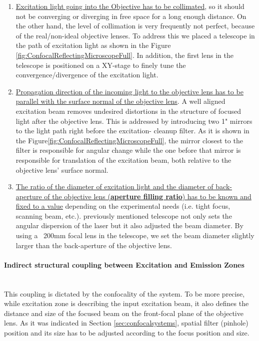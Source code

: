 \begin{enumerate}
	\item \ul{Excitation light going into the Objective has to be collimated}, so it should not be
	converging or diverging in free space for a long enough distance. On the other hand, the level of 
	collimation is very frequently not perfect, because of the real/non-ideal objective lenses.
	To address this we placed a telescope in the path of excitation light as shown in the Figure
	\ref{fig:ConfocalReflectingMicroscopeFull}. In addition, the first lens in the telescope is 
	positioned on a XY-stage to finely tune the convergence/divergence of the excitation light.
	
	\item \ul{Propagation direction of the incoming light to the objective lens has to be 
	parallel with the surface normal of the objective lens}. A well aligned excitation beam 
	removes undesired distortions in the structure of focused light after the objective lens.
	This is addressed by introducing two 1" mirrors to the light path right before the excitation-
	cleanup filter. As it is shown in the Figure\ref{fig:ConfocalReflectingMicroscopeFull},
	the mirror closest to the filter is responsible for angular change while the one before
	that mirror is responsible for translation of the excitation beam, both relative to the
	objective lens' surface normal.
	
	\item \ul{The ratio of the diameter of excitation light and the diameter of back-aperture of the 
	objective lens (\textbf{aperture filling ratio}) has to be known and fixed to a value} 
	depending on the experimental needs (i.e. tight focus, scanning beam, etc.). previously mentioned
	telescope not only sets the angular dispersion of the laser but it also adjusted the beam diameter.
	By using a ~200mm focal lens in the telescope, we set the beam diameter slightly larger than 
	the back-aperture of the objective lens.
\end{enumerate}

\paragraph{Indirect structural coupling between Excitation and Emission Zones}\mbox{}\\
This coupling is dictated by the confocality of the system. To be more precise, while excitation
zone is describing the input excitation beam, it also defines the distance and size of the
focused beam on the front-focal plane of the objective lens. As it was indicated in Section
\ref{sec:confocalsystems}, spatial filter (pinhole) position and its size has to be adjusted
according to the focus position and size. 

